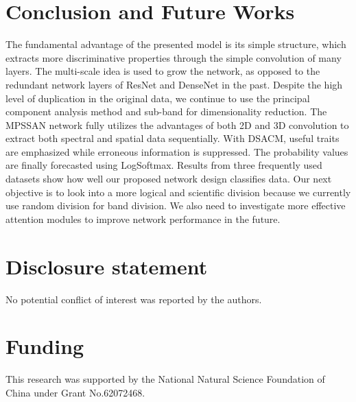 \documentclass[]{interact}
\theoremstyle{plain}%
\theoremstyle{definition}
\theoremstyle{remark}
\begin{document}
\section{Conclusion and Future Works}

The fundamental advantage of the presented model is its simple structure, which extracts more discriminative properties through the simple convolution of many layers. The multi-scale idea is used to grow the network, as opposed to the redundant network layers of ResNet and DenseNet in the past. Despite the high level of duplication in the original data, we continue to use the principal component analysis method and sub-band for dimensionality reduction. The MPSSAN network fully utilizes the advantages of both 2D and 3D convolution to extract both spectral and spatial data sequentially. With DSACM, useful traits are emphasized while erroneous information is suppressed. The probability values are finally forecasted using LogSoftmax. Results from three frequently used datasets show how well our proposed network design classifies data. Our next objective is to look into a more logical and scientific division because we currently use random division for band division. We also need to investigate more effective attention modules to improve network performance in the future.


\section*{Disclosure statement}

No potential conflict of interest was reported by the authors.

\section*{Funding}

This research was supported by the National Natural Science Foundation of China under Grant No.62072468.


\end{document}
